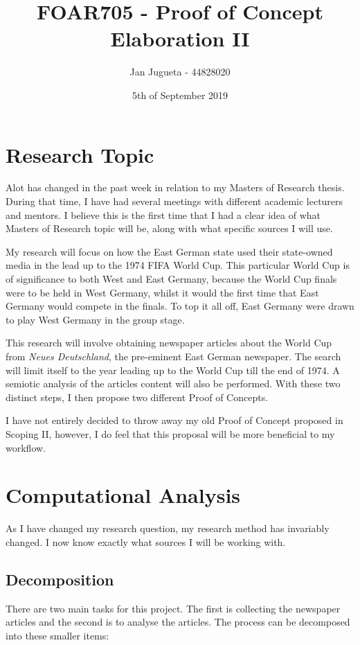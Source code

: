 \documentclass{article}
\title{FOAR705 - Proof of Concept Elaboration II}
\author{Jan Jugueta - 44828020}
\date{5th of September 2019}
\begin{document}
\maketitle

\section*{Research Topic}

Alot has changed in the past week in relation to my Masters of Research thesis. During that time, I have had several meetings with different academic lecturers and mentors. I believe this is the first time that I had a clear idea of what Masters of Research topic will be, along with what specific sources I will use.

My research will focus on how the East German state used their state-owned media in the lead up to the 1974 FIFA World Cup. This particular World Cup is of significance to both West and East Germany, because the World Cup finals were to be held in West Germany, whilst it would the first time that East Germany would compete in the finals. To top it all off, East Germany were drawn to play West Germany in the group stage.

This research will involve obtaining newspaper articles about the World Cup from \textit{Neues Deutschland}, the pre-eminent East German newspaper. The search will limit itself to the year leading up to the World Cup till the end of 1974. A semiotic analysis of the articles content will also be performed. With these two distinct steps, I then propose two different Proof of Concepts. 

I have not entirely decided to throw away my old Proof of Concept proposed in Scoping II, however, I do feel that this proposal will be more beneficial to my workflow.

\section*{Computational Analysis}

As I have changed my research question, my research method has invariably changed. I now know exactly what sources I will be working with.

\subsection*{Decomposition}

There are two main tasks for this project. The first is collecting the newspaper articles and the second is to analyse the articles. The process can be decomposed into these smaller items:
\end{document}
